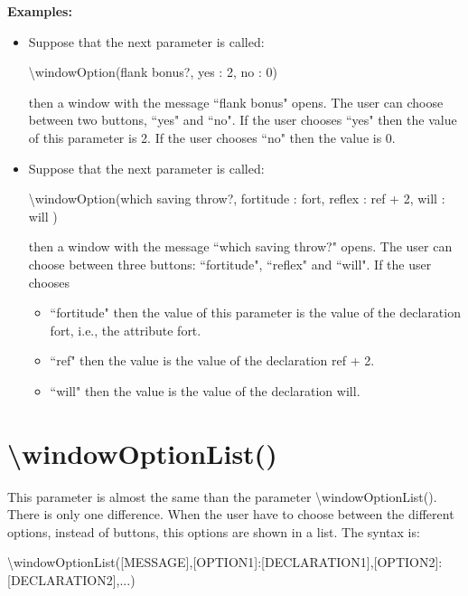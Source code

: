 \documentclass[11pt,a4paper,openright,oneside]{book}
\newenvironment{exs}
{
  \setlength{\parindent}{0cm}
  \large \textbf{Examples:} \normalsize
}
{}
\begin{document}
\begin{exs}
  \begin{itemize}
    \item Suppose that the next parameter is called:
    \begin{center} \textsf{\textbackslash windowOption(flank bonus?, yes : 2, no : 0)} \end{center}
    then a window with the message ``flank bonus" opens. The user can choose between two buttons, ``yes" and ``no". If the user chooses ``yes" then the value of this parameter is \textsf{2}. If the user chooses ``no" then the value is \textsf{0}.

    \item Suppose that the next parameter is called:
    \begin{center} \textsf{\textbackslash windowOption(which saving throw?, fortitude : fort, reflex : ref + 2, will : will )} \end{center}
    then a window with the message ``which saving throw?" opens. The user can choose between three buttons: ``fortitude", ``reflex" and ``will". If the user chooses
    \begin{itemize}
      \item ``fortitude" then the value of this parameter is the value of the declaration \textsf{fort}, i.e., the attribute \textsf{fort}. 
      \item ``ref" then the value is the value of the declaration \textsf{ref + 2}. 
      \item ``will" then the value is the value of the declaration \textsf{will}.
    \end{itemize} 
  \end{itemize}
\end{exs}

\section{\textsf{\textbackslash windowOptionList()}}

This parameter is almost the same than the parameter \textsf{\textbackslash windowOptionList()}. There is only one difference. When the user have to choose between the different options, instead of buttons, this options are shown in a list. The syntax is:

\begin{center} \small \textsf{\textbackslash windowOptionList(\textsc{\scriptsize[MESSAGE]},\textsc{\scriptsize[OPTION1]}:\textsc{\scriptsize[DECLARATION1]},\textsc{\scriptsize[OPTION2]}:\textsc{\scriptsize[DECLARATION2]},...)} \normalsize \end{center}
\end{document}
